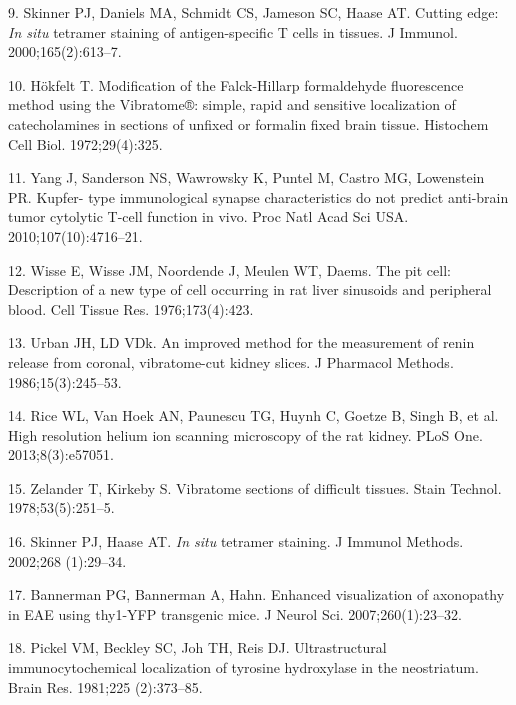 \documentclass{article}
\begin{document}
\begin{hangpars}
9. Skinner PJ, Daniels MA, Schmidt CS, Jameson SC, Haase AT. Cutting edge: \textit{In situ} tetramer staining of antigen-specific T cells in tissues. J Immunol. 2000;165(2):613–7.

10. Hökfelt T. Modification of the Falck-Hillarp formaldehyde fluorescence method using the Vibratome®: simple, rapid and sensitive localization of catecholamines in sections of unfixed or formalin fixed brain tissue. Histochem Cell Biol. 1972;29(4):325.

11. Yang J, Sanderson NS, Wawrowsky K, Puntel M, Castro MG, Lowenstein PR. Kupfer- type immunological synapse characteristics do not predict anti-brain tumor cytolytic T-cell function in vivo. Proc Natl Acad Sci USA. 2010;107(10):4716–21.

12. Wisse E, Wisse JM, Noordende J, Meulen WT, Daems. The pit cell: Description of a new type of cell occurring in rat liver sinusoids and peripheral blood. Cell Tissue Res. 1976;173(4):423.

13. Urban JH, LD VDk. An improved method for the measurement of renin release from coronal, vibratome-cut kidney slices. J Pharmacol Methods. 1986;15(3):245–53.

14. Rice WL, Van Hoek AN, Paunescu TG, Huynh C, Goetze B, Singh B, et al. High resolution helium ion scanning microscopy of the rat kidney. PLoS One. 2013;8(3):e57051.

15. Zelander T, Kirkeby S. Vibratome sections of difficult tissues. Stain Technol. 1978;53(5):251–5.

16. Skinner PJ, Haase AT. \textit{In situ} tetramer staining. J Immunol Methods. 2002;268 (1):29–34.

17. Bannerman PG, Bannerman A, Hahn. Enhanced visualization of axonopathy in EAE using thy1-YFP transgenic mice. J Neurol Sci. 2007;260(1):23–32.

18. Pickel VM, Beckley SC, Joh TH, Reis DJ. Ultrastructural immunocytochemical localization of tyrosine hydroxylase in the neostriatum. Brain Res. 1981;225 (2):373–85.
\end{hangpars}
\end{document}
